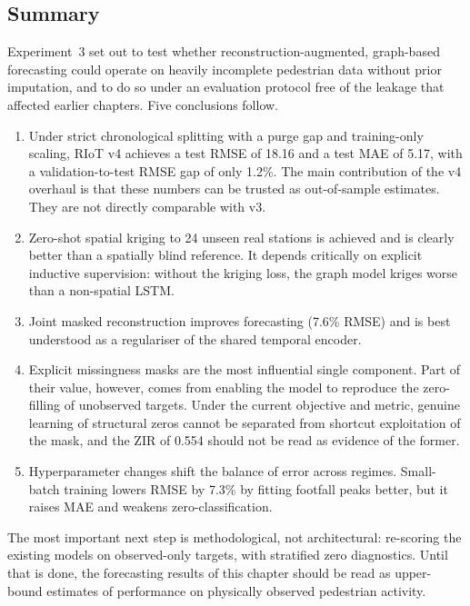 \subsection{Summary}
\label{sec:exp3-summary}

Experiment~3 set out to test whether reconstruction-augmented,
graph-based forecasting could operate on heavily incomplete pedestrian
data without prior imputation, and to do so under an evaluation
protocol free of the leakage that affected earlier chapters. Five
conclusions follow.

\begin{enumerate}
    \item Under strict chronological splitting with a purge gap and
    training-only scaling, RIoT v4 achieves a test RMSE of 18.16 and a
    test MAE of 5.17, with a validation-to-test RMSE gap of only 1.2\%.
    The main contribution of the v4 overhaul is that these numbers can
    be trusted as out-of-sample estimates. They are not directly
    comparable with v3.
    \item Zero-shot spatial kriging to 24 unseen real stations is
    achieved and is clearly better than a spatially blind reference.
    It depends critically on explicit inductive supervision: without the
    kriging loss, the graph model kriges worse than a non-spatial LSTM.
    \item Joint masked reconstruction improves forecasting (7.6\% RMSE)
    and is best understood as a regulariser of the shared temporal
    encoder.
    \item Explicit missingness masks are the most influential single
    component. Part of their value, however, comes from enabling the
    model to reproduce the zero-filling of unobserved targets. Under the
    current objective and metric, genuine learning of structural zeros
    cannot be separated from shortcut exploitation of the mask, and the
    ZIR of 0.554 should not be read as evidence of the former.
    \item Hyperparameter changes shift the balance of error across
    regimes. Small-batch training lowers RMSE by 7.3\% by fitting
    footfall peaks better, but it raises MAE and weakens
    zero-classification.
\end{enumerate}

The most important next step is methodological, not architectural:
re-scoring the existing models on observed-only targets, with stratified
zero diagnostics. Until that is done, the forecasting results of this
chapter should be read as upper-bound estimates of performance on
physically observed pedestrian activity.
